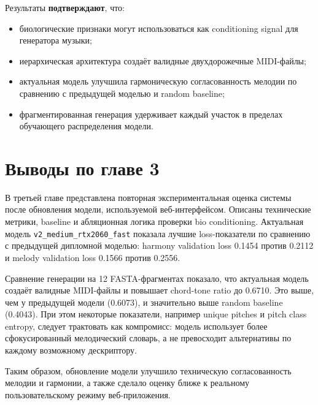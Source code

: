 Результаты \textbf{подтверждают}, что:
\begin{itemize}
\item биологические признаки могут использоваться как conditioning signal для генератора музыки;
\item иерархическая архитектура создаёт валидные двухдорожечные MIDI-файлы;
\item актуальная модель улучшила гармоническую согласованность мелодии по сравнению с предыдущей моделью и random baseline;
\item фрагментированная генерация удерживает каждый участок в пределах обучающего распределения модели.
\end{itemize}

\section*{Выводы по главе 3}

В третьей главе представлена повторная экспериментальная оценка системы после обновления модели, используемой веб-интерфейсом. Описаны технические метрики, baseline и абляционная логика проверки bio conditioning. Актуальная модель \texttt{v2\_medium\_rtx2060\_fast} показала лучшие loss-показатели по сравнению с предыдущей дипломной моделью: harmony validation loss 0.1454 против 0.2112 и melody validation loss 0.1566 против 0.2556.

Сравнение генерации на 12 FASTA-фрагментах показало, что актуальная модель создаёт валидные MIDI-файлы и повышает chord-tone ratio до 0.6710. Это выше, чем у предыдущей модели (0.6073), и значительно выше random baseline (0.4043). При этом некоторые показатели, например unique pitches и pitch class entropy, следует трактовать как компромисс: модель использует более сфокусированный мелодический словарь, а не превосходит альтернативы по каждому возможному дескриптору.

Таким образом, обновление модели улучшило техническую согласованность мелодии и гармонии, а также сделало оценку ближе к реальному пользовательскому режиму веб-приложения.
